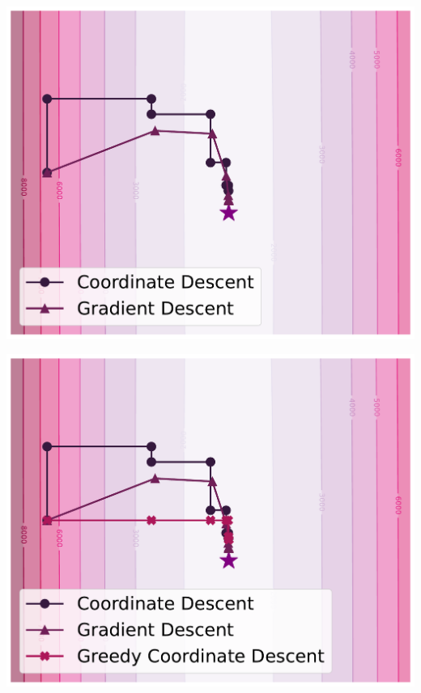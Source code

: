 \documentclass{beamer}
\begin{document}
\hspace{-3.3em}
\begin{frame}
  \vspace{-1.8em}
  \includegraphics[width=1.17\textwidth]{example_2_nopriv.pdf}
  \addtocounter{framenumber}{-1}
\end{frame}

\hspace{-3.3em}
\begin{frame}
  \vspace{-1.8em}
  \includegraphics[width=1.17\textwidth]{example_3_nopriv.pdf}
  \addtocounter{framenumber}{-1}
\end{frame}
\end{document}

